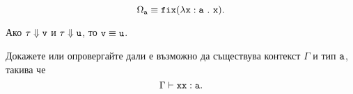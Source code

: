 \begin{example}
  \[\Omega_{\texttt{a}} \equiv \texttt{fix}(\lambda\texttt{x}:\texttt{a}\ .\ {\texttt{x}}).\]
\end{example}


\begin{lemma}
  Ако $\tau \Downarrow \texttt{v}$ и $\tau \Downarrow \texttt{u}$, то $\texttt{v} \equiv \texttt{u}$.
\end{lemma}


\begin{problem}
  Докажете или опровергайте дали е възможно да съществува контекст $\Gamma$ и тип $\texttt{a}$, такива че
  \[\Gamma \vdash \texttt{xx}:\texttt{a}.\]
\end{problem}


